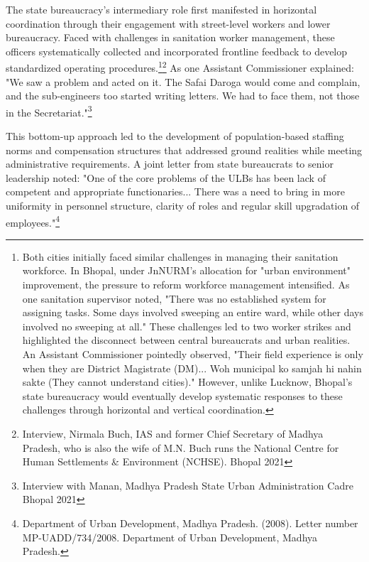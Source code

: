 The state bureaucracy's intermediary role first manifested in horizontal coordination through their engagement with street-level workers and lower bureaucracy. Faced with challenges in sanitation worker management, these officers systematically collected and incorporated frontline feedback to develop standardized operating procedures.\footnote{Both cities initially faced similar challenges in managing their sanitation workforce. In Bhopal, under JnNURM's allocation for "urban environment" improvement, the pressure to reform workforce management intensified. As one sanitation supervisor noted, "There was no established system for assigning tasks. Some days involved sweeping an entire ward, while other days involved no sweeping at all." These challenges led to two worker strikes and highlighted the disconnect between central bureaucrats and urban realities. An Assistant Commissioner pointedly observed, "Their field experience is only when they are District Magistrate (DM)... Woh municipal ko samjah hi nahin sakte (They cannot understand cities)." However, unlike Lucknow, Bhopal's state bureaucracy would eventually develop systematic responses to these challenges through horizontal and vertical coordination.}\footnote{Interview, Nirmala Buch, IAS and former Chief Secretary of Madhya Pradesh, who is also the wife of M.N. Buch runs the National Centre for Human Settlements & Environment (NCHSE). Bhopal 2021}
As one Assistant Commissioner explained: "We saw a problem and acted on it. The Safai Daroga would come and complain, and the sub-engineers too started writing letters. We had to face them, not those in the Secretariat."\footnote{Interview with Manan, Madhya Pradesh State Urban Administration Cadre Bhopal 2021}

This bottom-up approach led to the development of population-based staffing norms and compensation structures that addressed ground realities while meeting administrative requirements. A joint letter from state bureaucrats to senior leadership noted: "One of the core problems of the ULBs has been lack of competent and appropriate functionaries... There was a need to bring in more uniformity in personnel structure, clarity of roles and regular skill upgradation of employees."\footnote{Department of Urban Development, Madhya Pradesh. (2008). Letter number MP-UADD/734/2008. Department of Urban Development, Madhya Pradesh.
}

